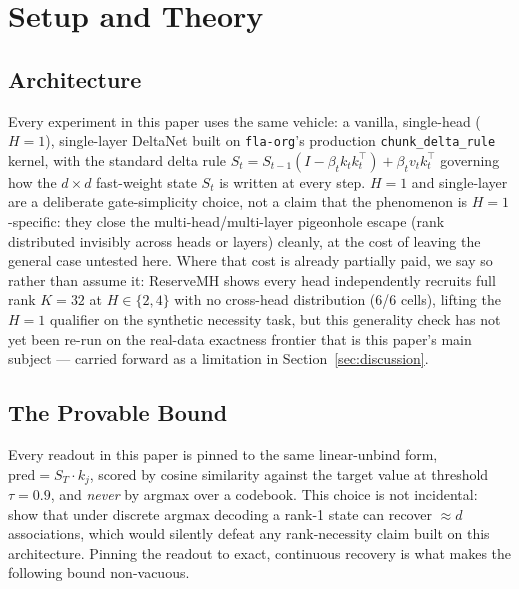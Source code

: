 \section{Setup and Theory}
\label{sec:setup}


\subsection{Architecture}

Every experiment in this paper uses the same vehicle: a vanilla,
single-head ($H{=}1$), single-layer DeltaNet built on \texttt{fla-org}'s
production \texttt{chunk\_delta\_rule} kernel, with the standard delta
rule $S_t = S_{t-1}(I - \beta_t k_t k_t^\top) + \beta_t v_t k_t^\top$
governing how the $d\times d$ fast-weight state $S_t$ is written at every
step. $H{=}1$ and single-layer are a deliberate gate-simplicity choice,
not a claim that the phenomenon is $H{=}1$-specific: they close the
multi-head/multi-layer pigeonhole escape (rank distributed invisibly
across heads or layers) cleanly, at the cost of leaving the general case
untested here. Where that cost is already partially paid, we say so
rather than assume it: ReserveMH shows every head independently recruits
full rank $K{=}32$ at $H\in\{2,4\}$ with no cross-head distribution
(6/6 cells), lifting the $H{=}1$ qualifier on the synthetic necessity
task, but this generality check has not yet been re-run on the real-data
exactness frontier that is this paper's main subject --- carried forward
as a limitation in Section~\ref{sec:discussion}.

\subsection{The Provable Bound}

Every readout in this paper is pinned to the same linear-unbind form,
$\mathrm{pred} = S_T \cdot k_j$, scored by cosine similarity against the
target value at threshold $\tau{=}0.9$, and \emph{never} by argmax over a
codebook. This choice is not incidental: \citet{nichani2025factual} show
that under discrete argmax decoding a rank-1 state can recover
$\approx d$ associations, which would silently defeat any rank-necessity
claim built on this architecture. Pinning the readout to exact,
continuous recovery is what makes the following bound non-vacuous.

